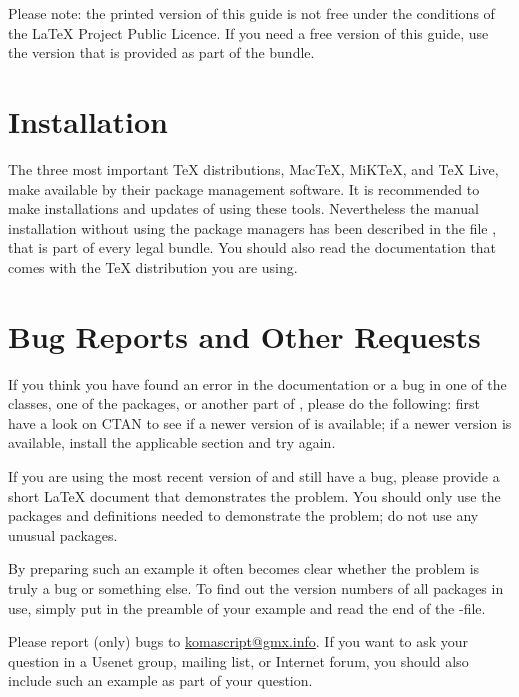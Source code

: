 %
{Please note: the printed version of this guide is not free under the
conditions of the {\LaTeX} Project Public Licence. If you need a free version
of this guide, use the version that is provided as part of the {\KOMAScript}
bundle.}


\section{Installation}

The three most important \TeX{} distributions, Mac\TeX, MiK\TeX, and \TeX{}
Live, make \KOMAScript{} available by their package management software. It is
recommended to make installations and updates of \KOMAScript{} using these
tools. Nevertheless the manual installation without using the package managers
has been described in the file , that is part of every legal
\KOMAScript{} bundle. You should also read the documentation that comes with
the {\TeX} distribution you are using.


\section{Bug Reports and Other Requests}

If you think you have found an error in the documentation or a bug in one of
the {\KOMAScript} classes, one of the {\KOMAScript} packages, or another part
of {\KOMAScript}, please do the following: first have a look on CTAN to see if
a newer version of {\KOMAScript} is available; if a newer version is
available, %
install the
applicable section and try again.

If you are using the most recent version of {\KOMAScript} and still have a
bug, please provide a short {\LaTeX} document that demonstrates the
problem. You should only use the packages and definitions needed to
demonstrate the problem; do not use any unusual packages.

By preparing such an example it often becomes clear whether the problem is
truly a {\KOMAScript} bug or something else.  To find out the version numbers
of all packages in use, simply put  in the preamble of your
example and read the end of the -file.

Please report {\KOMAScript} (only) bugs to
\href{mailto:komascript@gmx.info}{komascript@gmx.info}. If you want to ask
your question in a Usenet group, mailing list, or Internet forum, you should
also include such an example as part of your question.


